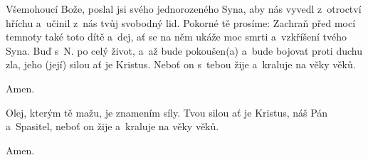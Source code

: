 
Všemohoucí Bože, poslal jsi svého jednorozeného Syna,
aby nás vyvedl z~otroctví hříchu
a~učinil z~nás tvůj svobodný lid.
Pokorné tě prosíme:
Zachraň před mocí temnoty také toto dítě
a~dej, ať se na něm ukáže moc smrti a~vzkříšení tvého Syna.
Buď s~{\color{red}N.} po celý život,
a~až bude pokoušen(a) a~bude bojovat proti duchu zla,
jeho (její) silou ať je Kristus.
Neboť on s~tebou žije a~kraluje na věky věků.

 Amen.


Olej, kterým tě mažu, je znamením síly.
Tvou silou ať je Kristus, náš Pán a~Spasitel, neboť on žije a~kraluje na věky věků.

 Amen.

